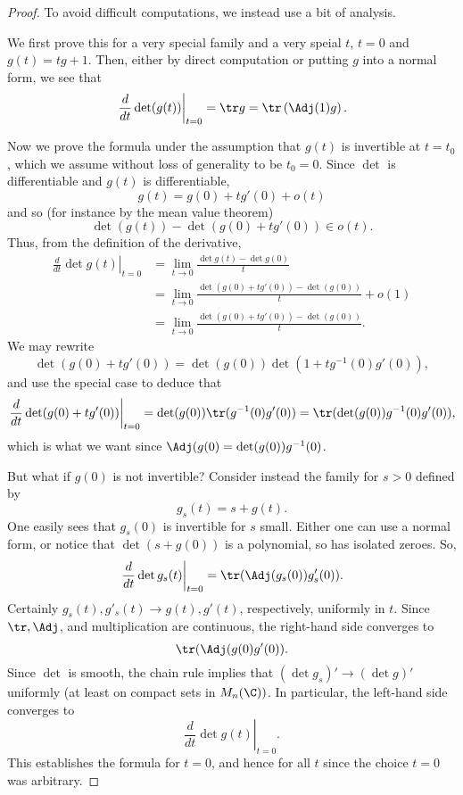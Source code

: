 \documentclass[12pt]{article}
\begin{document}
\begin{proof}
To avoid difficult computations, we instead use a bit of analysis.

We first prove this for a very special family and a very speial $t$, $t=0$ and $g(t) = tg+1$. Then, either by direct computation or putting $g$ into a normal form, we see that
\[\left.\frac{d}{dt} \det(g(t))\right|_{t=0} = \tr g = \tr\left(\Adj(1)g\right).\]

Now we prove the formula under the assumption that $g(t)$ is invertible at $t=t_0$, which we assume without loss of generality to be $t_0=0$. Since $\det$ is differentiable and $g(t)$ is differentiable,
\[g(t) = g(0) + tg'(0) + o(t)\]
and so (for instance by the mean value theorem)
\[\det(g(t))-\det(g(0) + tg'(0)) \in o(t).\]
 Thus, from the definition of the derivative,
\begin{align*}
\left.\frac{d}{dt} \det g(t)\right|_{t=0} &= \lim_{t \to 0} \frac{\det g(t)-\det g(0)}{t}\\
&= \lim_{t \to 0} \frac{\det(g(0)+tg'(0))-\det(g(0))}{t} + o(1)\\
&= \lim_{t \to 0} \frac{\det(g(0)+tg'(0))-\det(g(0))}{t}.\end{align*}
We may rewrite
\[\det(g(0) + tg'(0)) = \det(g(0))\det(1+tg^{-1}(0)g'(0)),\] and use the special case to deduce that
\[\left.\frac{d}{dt} \det(g(0) + tg'(0))\right|_{t=0} = \det(g(0))\tr(g^{-1}(0)g'(0)) = \tr(\det(g(0))g^{-1}(0)g'(0)),\]
which is what we want since $\Adj(g(0) = \det(g(0))g^{-1}(0)$. 

But what if $g(0)$ is not invertible? Consider instead the family for $s > 0$ defined by
\[g_s(t) = s+g(t).\] One easily sees that $g_s(0)$ is invertible for $s$ small. Either one can use a normal form, or notice that $\det(s+g(0))$ is a polynomial, so has isolated zeroes.
So,
\[\left.\frac{d}{dt} \det g_s(t)\right|_{t=0} = \tr(\Adj(g_s(0))g'_s(0)).\]
Certainly $g_s(t),g'_s(t) \to g(t),g'(t)$, respectively, uniformly in $t$. Since $\tr, \Adj$, and multiplication are continuous, the right-hand side converges to
\[\tr(\Adj(g(0)g'(0)).\] Since $\det$ is smooth, the chain rule implies that $(\det g_s)' \to (\det g)'$ uniformly (at least on compact sets in $M_n(\C))$. In particular, the left-hand side converges to
\[\left.\frac{d}{dt} \det g(t)\right|_{t=0}.\]
This establishes the formula for $t=0$, and hence for all $t$ since the choice $t=0$ was arbitrary.\end{proof}
\end{document}
